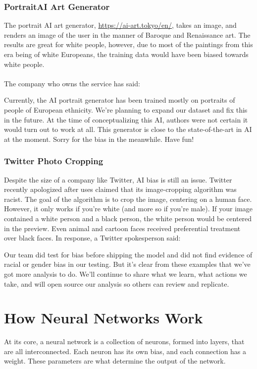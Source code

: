 \documentclass[titlepage]{article}
\begin{document}
\subsubsection{PortraitAI Art Generator}
The portrait AI art generator, \url{https://ai-art.tokyo/en/}, takes an image, and renders an image of the user in the manner of Baroque and Renaissance art. The results are great for white people, however, due to most of the paintings from this era being of white Europeans, the training data would have been biased towards white people.
\\\\
The company who owns the service has said:
\begin{quoting}
    Currently, the AI portrait generator has been trained mostly on portraits of people of European ethnicity. We're planning to expand our dataset and fix this in the future. At the time of conceptualizing this AI, authors were not certain it would turn out to work at all. This generator is close to the state-of-the-art in AI at the moment. Sorry for the bias in the meanwhile. Have fun!
\end{quoting}

\subsubsection{Twitter Photo Cropping}
Despite the size of a company like Twitter, AI bias is still an issue. Twitter recently apologized after uses claimed that its image-cropping algorithm was racist. The goal of the algorithm is to crop the image, centering on a human face. However, it only works if you're white (and more so if you're male). If your image contained a white person and a black person, the white person would be centered in the preview. Even animal and cartoon faces received preferential treatment over black faces. In response, a Twitter spokesperson said:
\begin{quoting}
    Our team did test for bias before shipping the model and did not find evidence of racial or gender bias in our testing. But it's clear from these examples that we've got more analysis to do. We'll continue to share what we learn, what actions we take, and will open source our analysis so others can review and replicate.
\end{quoting}
\newpage
\section{How Neural Networks Work}
At its core, a neural network is a collection of neurons, formed into layers, that are all interconnected. Each neuron has its own bias, and each connection has a weight. These parameters are what determine the output of the network. 
\end{document}
